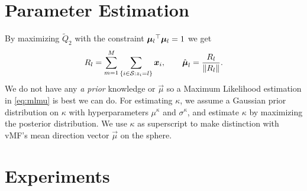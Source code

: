 \documentclass[runningheads,a4paper]{llncs}
\begin{document}
\section{Parameter Estimation}
By maximizing $\widetilde Q_2$ with the constraint $\vec \mu_l\T \vec \mu_l = 1$ we get 
\begin{equation}
  R_l = \sum_{m=1}^{M}\sum_{\{i \in \cS: z_i  = l\}}^{} \vec x_i, \qquad \hat {\vec \mu}_l = \frac{R_l}{\norm{R_l}}.
  \label{eq:mlmu}
\end{equation}
We do not have any \emph{a prior} knowledge or $\vec \mu$ so a Maximum Likelihood estimation  in \eqref{eq:mlmu} is best we can do. For estimating $\kappa$, we assume a Gaussian prior distribution on $\kappa$ with hyperparameters $\mu^{\kappa}$ and $\sigma^{\kappa}$, and estimate $\kappa$ by maximizing the posterior distribution. We use $\kappa$ as superscript to make distinction with vMF's mean direction vector $\vec \mu$ on the sphere.
\section{Experiments}
 

\end{document}
